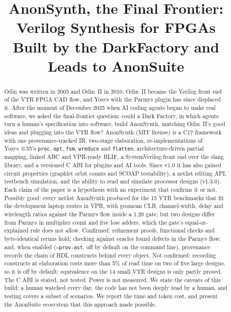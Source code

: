 \documentclass[conference]{IEEEtran}
\newcommand{\code}[1]{\texttt{#1}}
\begin{document}
\title{AnonSynth, the Final Frontier:\\
Verilog Synthesis for FPGAs\\Built by the DarkFactory and Leads to AnonSuite}

\author{
}

\maketitle

\begin{abstract}
Odin was written in 2005 and Odin~II in 2010. Odin~II became the Verilog front end of the VTR FPGA CAD flow, and Yosys with the Parmys plugin has since displaced it. After the moment of December 2025 when AI coding agents began to make real software, we asked the final-frontier question: could a Dark Factory, in which agents turn a human's specification into software, build AnonSynth, matching Odin~II's good ideas and plugging into the VTR flow? AnonSynth (MIT license) is a C17 framework with one provenance-tracked IR, two-stage elaboration, re-implementations of Yosys~0.55's \code{proc}, \code{opt}, \code{fsm}, \code{wreduce} and \code{flatten}, architecture-driven partial mapping, linked ABC and VPR-ready BLIF, a SystemVerilog front end over the slang library, and a versioned C ABI for plugins and AI tools. Since v1.0 it has also gained circuit properties (graphlet orbit counts and SCOAP testability), a netlist editing API, testbench simulation, and the ability to read and simulate processor designs (v1.3.0). Each claim of the paper is a hypothesis with an experiment that confirms it or not. Possibly good: every netlist AnonSynth produced for the 15 VTR benchmarks that fit the development laptop routes in VPR, with geomean CLB, channel-width, delay and wirelength ratios against the Parmys flow inside a 1.20 gate, but two designs differ from Parmys in multiplier count and five lose adders, which the gate's equal-or-explained rule does not allow. Confirmed: refinement proofs, functional checks and byte-identical reruns hold; checking against oracles found defects in the Parmys flow; and, when enabled (\code{--prov-ast}, off by default on the command line), provenance records the chain of HDL constructs behind every object. Not confirmed: recording constructs at elaboration costs more than 5\% of read time on two of five large designs, so it is off by default; equivalence on the 14 small VTR designs is only partly proved. The C ABI is stated, not tested. Power is not measured. We state the caveats of this build: a human watched every day, the code has not been deeply read by a human, and testing covers a subset of scenarios. We report the time and token cost, and present the AnonSuite ecosystem that this approach made possible.
\end{abstract}
\end{document}
